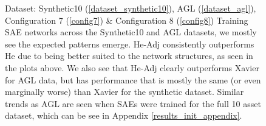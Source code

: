 \documentclass[a4paper,11pt,oneside]{article}
\theoremstyle{plain}
\theoremstyle{definition}
\begin{document}
\begin{figure}[H]
\begin{subfigure}{.5\textwidth}
			\label{figure-agl_mse_init}
		\end{subfigure}
		\caption[SAE MSE by Weight Initialization]
		{Dataset: Synthetic10 (\ref{dataset_synthetic10}), AGL (\ref{dataset_agl}), Configuration 7 (\ref{config7}) \& Configuration 8 (\ref{config8})
			\newline Training SAE networks across the Synthetic10 and AGL  datasets, we mostly see the expected patterns emerge. He-Adj consistently outperforms He due to being better suited to the network structures, as seen in the plots above. We also see that He-Adj clearly outperforms Xavier for AGL data, but has performance that is mostly the same (or even marginally worse) than Xavier for the synthetic dataset. Similar trends as AGL are seen when SAEs were trained for the full 10 asset dataset, which can be see in Appendix \ref{results_init_appendix}.}
		\label{figure-mse_init}
	\end{figure}
	
\end{document}
